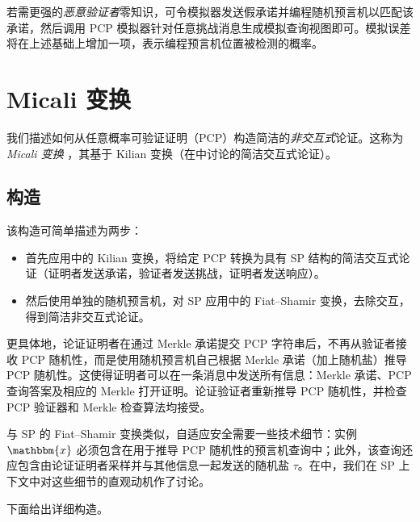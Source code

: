 \documentclass[american,singlepageview]{snargs-book-zh}
\newcommand{\Instance}{\mathbbm{x}}
\newcommand{\ProtoSalt}{\tau}
\newcommand{\RandSaltString}{\ProtoSalt}
\begin{document}
若需更强的\emph{恶意验证者}零知识，可令模拟器发送假承诺并编程随机预言机以匹配该承诺，然后调用 PCP 模拟器针对任意挑战消息生成模拟查询视图即可。模拟误差将在上述基础上增加一项，表示编程预言机位置被检测的概率。

\chapter{Micali 变换}
\label{chapter:micali-transformation}

我们描述如何从任意概率可验证证明（PCP）构造简洁的\emph{非交互式}论证。这称为\emph{Micali 变换} \cite{Micali00}，其基于 Kilian 变换（在中讨论的简洁交互式论证）。

\section{构造}
\label{section:micali-construction}

该构造可简单描述为两步：
\begin{itemize}[noitemsep]
  \item 首先应用中的 Kilian 变换，将给定 PCP 转换为具有 SP 结构的简洁交互式论证（证明者发送承诺，验证者发送挑战，证明者发送响应）。
  \item 然后使用单独的随机预言机，对 SP 应用中的 Fiat--Shamir 变换，去除交互，得到简洁非交互式论证。
\end{itemize}
更具体地，论证证明者在通过 Merkle 承诺提交 PCP 字符串后，不再从验证者接收 PCP 随机性，而是使用随机预言机自己根据 Merkle 承诺（加上随机盐）推导 PCP 随机性。这使得证明者可以在一条消息中发送所有信息：Merkle 承诺、PCP 查询答案及相应的 Merkle 打开证明。论证验证者重新推导 PCP 随机性，并检查 PCP 验证器和 Merkle 检查算法均接受。

与 SP 的 Fiat--Shamir 变换类似，自适应安全需要一些技术细节：实例 $\Instance$ 必须包含在用于推导 PCP 随机性的预言机查询中；此外，该查询还应包含由论证证明者采样并与其他信息一起发送的随机盐 $\RandSaltString$。在中，我们在 SP 上下文中对这些细节的直观动机作了讨论。

下面给出详细构造。
\end{document}
